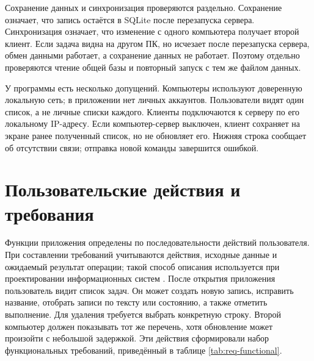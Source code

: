 Сохранение данных и синхронизация проверяются раздельно. Сохранение означает, что запись остаётся в SQLite после перезапуска сервера. Синхронизация означает, что изменение с одного компьютера получает второй клиент. Если задача видна на другом ПК, но исчезает после перезапуска сервера, обмен данными работает, а сохранение данных не работает. Поэтому отдельно проверяются чтение общей базы и повторный запуск с тем же файлом данных.

У программы есть несколько допущений. Компьютеры используют доверенную локальную сеть; в приложении нет личных аккаунтов. Пользователи видят один список, а не личные списки каждого. Клиенты подключаются к серверу по его локальному IP-адресу. Если компьютер-сервер выключен, клиент сохраняет на экране ранее полученный список, но не обновляет его. Нижняя строка сообщает об отсутствии связи; отправка новой команды завершится ошибкой.

\section{Пользовательские действия и требования}

Функции приложения определены по последовательности действий пользователя. При составлении требований учитываются действия, исходные данные и ожидаемый результат операции; такой способ описания используется при проектировании информационных систем \cite{zaramenskikh,chistov}. После открытия приложения пользователь видит список задач. Он может создать новую запись, исправить название, отобрать записи по тексту или состоянию, а также отметить выполнение. Для удаления требуется выбрать конкретную строку. Второй компьютер должен показывать тот же перечень, хотя обновление может произойти с небольшой задержкой. Эти действия сформировали набор функциональных требований, приведённый в таблице \ref{tab:req-functional}.

